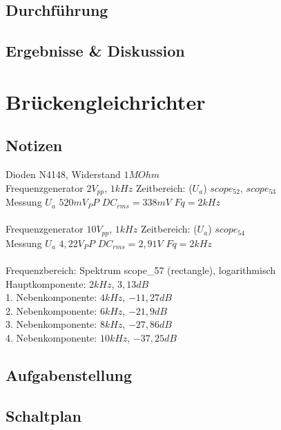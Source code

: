 \documentclass[12pt,a4paper,titlepage]{article}
\begin{document}
\subsection*{Durchf\"uhrung}

\subsection*{Ergebnisse \& Diskussion}



\section{Brückengleichrichter}

\subsection*{Notizen}
Dioden N4148, Widerstand $1MOhm$ \\

Frequenzgenerator $2V_{pp}$, $1kHz$
Zeitbereich: ($U_a$) $scope_52$, $scope_53$ \\
Messung $U_a$ $520mV_PP$ $DC_{rms}=338mV$ $Fq=2kHz$ \\
\\
Frequenzgenerator $10V_{pp}$, $1kHz$
Zeitbereich: ($U_a$) $scope_54$ \\
Messung $U_a$ $4,22V_PP$ $DC_{rms}=2,91V$ $Fq=2kHz$ \\
\\


Frequenzbereich:
Spektrum scope_57 (rectangle), logarithmisch \\
Hauptkomponente: $2kHz$, $3,13dB$ \\
1. Nebenkomponente: $4kHz$, $-11,27dB$ \\
2. Nebenkomponente: $6kHz$, $-21,9dB$ \\
3. Nebenkomponente: $8kHz$, $-27,86dB$ \\
4. Nebenkomponente: $10kHz$, $-37,25dB$


\subsection*{Aufgabenstellung}

\subsection*{Schaltplan}
\end{document}
